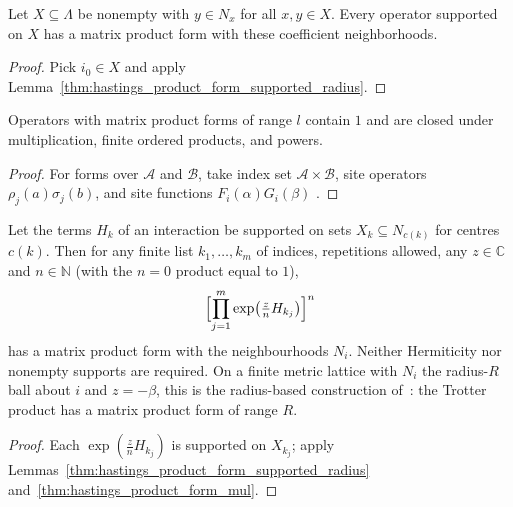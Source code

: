 \begin{lemma}
    \label{thm:hastings_product_form_supported}
    \leanok
    Let $X\subseteq\Lambda$ be nonempty
    with $y\in N_x$ for all $x,y\in X$.
    Every operator supported on $X$ has a matrix product form with these
    coefficient neighborhoods.
\end{lemma}
\begin{proof}\leanok
    Pick $i_0\in X$ and apply
    Lemma~\ref{thm:hastings_product_form_supported_radius}.
\end{proof}

\begin{lemma}
    \label{thm:hastings_product_form_mul}
    \leanok
    Operators with matrix product forms of range $l$ contain $1$ and are closed
    under multiplication, finite ordered products, and powers.
\end{lemma}
\begin{proof}\leanok
    For forms over $\mathcal A$ and $\mathcal B$, take index set
    $\mathcal A\times\mathcal B$, site operators $\rho_j(a)\sigma_j(b)$, and
    site functions $F_i(\alpha)G_i(\beta)$
    \cite[lines 1068--1077]{Hastings2006Solving}.
\end{proof}

\begin{lemma}
    \label{thm:hastings_trotter_product_form_radius}
    \leanok
    Let the terms $H_k$ of an interaction be supported on sets $X_k\subseteq N_{c(k)}$ for
    centres $c(k)$. Then for any finite list $k_1,\dots,k_m$ of indices, repetitions
    allowed, any $z\in\mathbb C$ and $n\in\mathbb N$ (with the $n=0$ product equal to $1$),
    \begin{align}
        \label{eq:hastings_trotter_product_radius}
        \Bigl[\prod_{j=1}^m\exp\bigl(\tfrac zn H_{k_j}\bigr)\Bigr]^n
    \end{align}
    has a matrix product form with the neighbourhoods $N_i$. Neither Hermiticity nor
    nonempty supports are required. On a finite metric lattice with $N_i$ the
    radius-$R$ ball about $i$ and $z=-\beta$, this is the radius-based construction
    of~\cite[lines 1053--1077]{Hastings2006Solving}: the Trotter product has a matrix
    product form of range $R$.
\end{lemma}
\begin{proof}\leanok
    Each $\exp(\tfrac znH_{k_j})$ is supported on $X_{k_j}$; apply
    Lemmas~\ref{thm:hastings_product_form_supported_radius}
    and~\ref{thm:hastings_product_form_mul}.
\end{proof}

